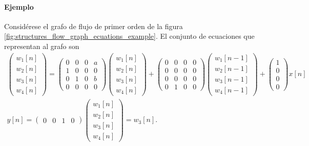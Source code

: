 \documentclass[a4paper]{report}
\newcommand{\w}{\mathbf{w}}
\begin{document}
\paragraph{Ejemplo} Considérese el grafo de flujo de primer orden de la figura \ref{fig:structures_flow_graph_ecuations_example}. El conjunto de ecuaciones que representan al grafo son
\begin{equation*}
 \begin{gathered}
  \begin{pmatrix}
   w_1[n]\\w_2[n]\\w_3[n]\\w_4[n]
  \end{pmatrix}=
  \begin{pmatrix}
   0 & 0 & 0 & a\\
   1 & 0 & 0 & 0\\
   0 & 1 & 0 & b\\
   0 & 0 & 0 & 0
  \end{pmatrix}
  \begin{pmatrix}
   w_1[n]\\w_2[n]\\w_3[n]\\w_4[n]
  \end{pmatrix}+
  \begin{pmatrix}
   0 & 0 & 0 & 0\\
   0 & 0 & 0 & 0\\
   0 & 0 & 0 & 0\\
   0 & 1 & 0 & 0
  \end{pmatrix}  
  \begin{pmatrix}
   w_1[n-1]\\w_2[n-1]\\w_3[n-1]\\w_4[n-1]
  \end{pmatrix}+
  \begin{pmatrix}
   1\\0\\0\\0
  \end{pmatrix}x[n]\\
  y[n]=
  \begin{pmatrix}
   0&0&1&0
  \end{pmatrix}
  \begin{pmatrix}
   w_1[n]\\w_2[n]\\w_3[n]\\w_4[n]
  \end{pmatrix}=w_3[n].  
  \end{gathered}
\end{equation*}
\end{document}
